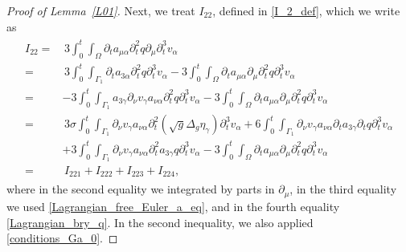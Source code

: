 \documentclass[10pt,reqno]{amsart}
\makeatletter
\theoremstyle{plain}
\theoremstyle{definition}
\numberwithin{equation}{section}
\newcommand{\al}{\alpha}
\newcommand{\ga}{\gamma}
\newcommand{\Ga}{\Gamma}
\newcommand{\si}{\sigma}
\newcommand{\Om}{\Omega}
\def\paragraph{\@startsection{paragraph}{4}%
  \z@\z@{-\fontdimen2\font}%
  {\normalfont\it}}
\makeatother
\begin{document}
\begin{proof}[Proof of Lemma~\ref{L01}]
Next, we treat $I_{22}$, defined in \eqref{I_2_def}, which we write as
\begin{align}
\begin{split}
I_{22} = & \,
 3 \int_0^t \int_\Om \partial_t a_{\mu\al} \partial^2_t q \partial_\mu \partial^3_t v_\al 
 \\
=
& \,
3 \int_0^t \int_{\Ga_1} \partial_t a_{3\al} \partial^2_t q \partial^3_t v_\al 
-
 3 \int_0^t \int_\Om \partial_t a_{\mu\al} \partial_\mu \partial^2_t q \partial^3_t v_\al 
 \\
 =
 &
 -3 \int_0^t \int_{\Ga_1}  a_{3\ga} \partial_\nu v_\ga a_{\nu \al}  \partial^2_t q \partial^3_t v_\al 
-  3 \int_0^t \int_\Om \partial_t a_{\mu\al} \partial_\mu \partial^2_t q \partial^3_t v_\al 
 \\
 = &\,
 3\si  \int_0^t \int_{\Ga_1} \partial_\nu v_\ga a_{\nu \al}  
 \partial^2_t (\sqrt{g} \Delta_g \eta_\ga)  \partial^3_t v_\al 
 + 6 \int_0^t \int_{\Ga_1} \partial_\nu v_\ga a_{\nu \al}   \partial_t a_{3 \ga} \partial_t q  \partial^3_t v_\al 
\\&
+ 3  \int_0^t \int_{\Ga_1} \partial_\nu v_\ga a_{\nu \al}   \partial^2_t a_{3 \ga}  q  \partial^3_t v_\al 
 -  3 \int_0^t \int_\Om \partial_t a_{\mu\al} \partial_\mu \partial^2_t q  \partial^3_t v_\al 
 \\
 = &\,
 I_{221} + I_{222} + I_{223} + I_{224},
\end{split}
\nonumber
\end{align}
where in the second equality we integrated by parts in
$\partial_{\mu}$, in the third equality
we used \eqref{Lagrangian_free_Euler_a_eq}, and in the fourth equality
\eqref{Lagrangian_bry_q}. 
In the second inequality, we also applied
\eqref{conditions_Ga_0}.


\end{proof}
\end{document}
